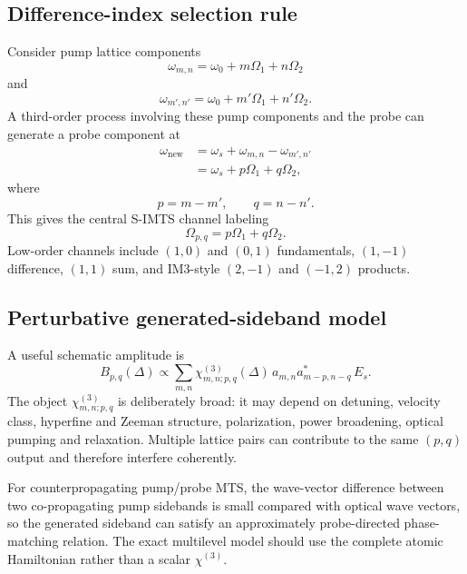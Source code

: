 \documentclass[10pt]{article}
\begin{document}
\subsection{Difference-index selection rule}
Consider pump lattice components
\begin{equation}
\omega_{m,n}=\omega_0+m\Omega_1+n\Omega_2
\end{equation}
and
\begin{equation}
\omega_{m',n'}=\omega_0+m'\Omega_1+n'\Omega_2.
\end{equation}
A third-order process involving these pump components and the probe can generate a probe component at
\begin{align}
\omega_{\text{new}}
&=\omega_s+\omega_{m,n}-\omega_{m',n'}\\
&=\omega_s+p\Omega_1+q\Omega_2,
\end{align}
where
\begin{equation}
p=m-m',\qquad q=n-n'.
\end{equation}
This gives the central S-IMTS channel labeling
\begin{equation}
\boxed{\Omega_{p,q}=p\Omega_1+q\Omega_2.}
\end{equation}
Low-order channels include $(1,0)$ and $(0,1)$ fundamentals, $(1,-1)$ difference, $(1,1)$ sum, and IM3-style $(2,-1)$ and $(-1,2)$ products.

\subsection{Perturbative generated-sideband model}
A useful schematic amplitude is
\begin{equation}
\boxed{
B_{p,q}(\Delta)\propto
\sum_{m,n}
\chi^{(3)}_{m,n;p,q}(\Delta)
\,a_{m,n}a_{m-p,n-q}^*\,E_s .}
\end{equation}
The object $\chi^{(3)}_{m,n;p,q}$ is deliberately broad: it may depend on detuning, velocity class, hyperfine and Zeeman structure, polarization, power broadening, optical pumping and relaxation. Multiple lattice pairs can contribute to the same $(p,q)$ output and therefore interfere coherently.

For counterpropagating pump/probe MTS, the wave-vector difference between two co-propagating pump sidebands is small compared with optical wave vectors, so the generated sideband can satisfy an approximately probe-directed phase-matching relation. The exact multilevel model should use the complete atomic Hamiltonian rather than a scalar $\chi^{(3)}$.
\end{document}
